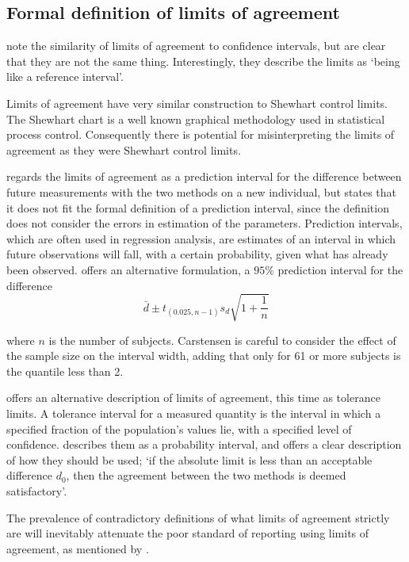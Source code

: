 \documentclass[Main.tex]{subfiles}
\begin{document}
	
	
	

\subsection{Formal definition of limits of agreement}
\citet{BA99} note the similarity of limits of agreement to
confidence intervals, but are clear that they are not the same
thing. Interestingly, they describe the limits as `being like a
reference interval'.

Limits of agreement have very similar construction to Shewhart
control limits. The Shewhart chart is a well known graphical
methodology used in statistical process control. Consequently
there is potential for misinterpreting the limits of agreement as
they were Shewhart control limits. 

\citet{BXC2008} regards the limits of agreement as a prediction
interval for the difference between future measurements with the
two methods on a new individual, but states that it does not fit
the formal definition of a prediction interval, since the
definition does not consider the errors in estimation of the
parameters. Prediction intervals, which are often used in
regression analysis, are estimates of an interval in which future
observations will fall, with a certain probability, given what has
already been observed. \citet{BXC2008} offers an alternative
formulation, a $95\%$ prediction interval for the difference
\[
\bar{d} \pm t_{(0.025, n-1)}s_{d} \sqrt{1+\frac{1}{n}}
\]

\noindent where $n$ is the number of subjects. Carstensen is
careful to consider the effect of the sample size on the interval
width, adding that only for 61 or more subjects is the
quantile less than 2.

\citet{luiz} offers an alternative description of limits of
agreement, this time as tolerance limits. A tolerance interval for
a measured quantity is the interval in which a specified fraction
of the population's values lie, with a specified level of
confidence. \citet{Barnhart} describes them as a probability
interval, and offers a clear description of how they should be
used; `if the absolute limit is less than an acceptable difference
$d_{0}$, then the agreement between the two methods is deemed
satisfactory'.

The prevalence of contradictory definitions of what limits of agreement strictly are will inevitably attenuate the poor standard of reporting using limits of agreement, as mentioned by \citet{mantha}.
\end{document}
